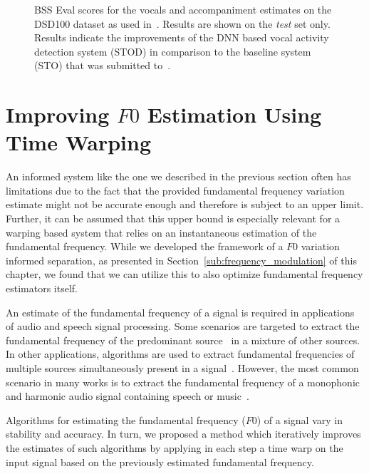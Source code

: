 \begin{figure}
  \centering
  
  \caption{BSS Eval scores for the vocals and accompaniment estimates on the DSD100 dataset as used in~\cite{liutkus17}. Results are shown on the \emph{test} set only. Results indicate the improvements of the DNN based vocal activity detection system (\textsc{STOD}) in comparison to the baseline system (\textsc{STO}) that was submitted to~\cite{ono15}.}
  \label{fig:05_comparison_sto_stodnn}
\end{figure}

\section{Improving $F0$ Estimation Using Time Warping} %
\label{sec:f0method}




An informed system like the one we described in the previous section often has limitations due to the fact that the provided fundamental frequency variation estimate might not be accurate enough and therefore is subject to an upper limit.
Further, it can be assumed that this upper bound is especially relevant for a warping based system that relies on an instantaneous estimation of the fundamental frequency.
While we developed the framework of a $F0$ variation informed separation, as presented in Section~\ref{sub:frequency_modulation} of this chapter, we found that we can utilize this to also optimize fundamental frequency estimators itself.
\par
An estimate of the fundamental frequency of a signal is required in applications of audio and speech signal processing.
Some scenarios are targeted to extract the fundamental frequency of the predominant source~\cite{salamon12} in a mixture of other sources.
In other applications, algorithms are used to extract fundamental frequencies of multiple sources simultaneously present in a signal~\cite{klapuri03}.
However, the most common scenario in many works is to extract the fundamental frequency of a monophonic and harmonic audio signal containing speech or music~\cite{talkin95, boersma02, decheveigne02, resch07, tidhar10, christensen07}.
\par
Algorithms for estimating the fundamental frequency ($F0$) of a signal vary in stability and accuracy.
In turn, we proposed a method which iteratively improves the estimates of such algorithms by applying in each step a time warp on the input signal based on the previously estimated fundamental frequency.

